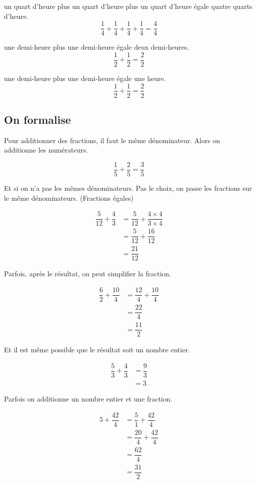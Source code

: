 \documentclass[12pt]{article}
\begin{document}
un quart d'heure plus un quart d'heure plus un quart d'heure égale quatre quarts d'heure.
$$\dfrac{1}{4} + \dfrac{1}{4} + \dfrac{1}{4} + \dfrac{1}{4}= \dfrac{4}{4}$$

une demi-heure plus une demi-heure égale deux demi-heures.
$$\dfrac{1}{2} + \dfrac{1}{2} = \dfrac{2}{2}$$

une demi-heure plus une demi-heure égale une heure.
$$\dfrac{1}{2} + \dfrac{1}{2} = \dfrac{2}{2}$$

\newpage
\subsection*{On formalise}

Pour additionner des fractions, il faut le même dénominateur. Alors on additionne les numérateurs. 

$$\dfrac{1}{5} + \dfrac{2}{5} = \dfrac{3}{5}$$

Et si on n'a pas les mêmes dénominateurs. Pas le choix, on passe les fractions sur le même dénominateurs. (Fractions égales)

\begin{align*}
\dfrac{5}{12} + \dfrac{4}{3} &= \dfrac{5}{12} + \dfrac{4 \times 4}{3 \times 4}\\
							 &= \dfrac{5}{12} + \dfrac{16}{12} \\
                             &= \dfrac{21}{12}								 
\end{align*}


Parfois, après le résultat, on peut simplifier la fraction.

\begin{align*}
\dfrac{6}{2} + \dfrac{10}{4} &= \dfrac{12}{4} + \dfrac{10}{4}\\
							 &= \dfrac{22}{4} \\
							 &= \dfrac{11}{2}					 
\end{align*}


Et il est même possible que le résultat soit un nombre entier.

\begin{align*}
\dfrac{5}{3} + \dfrac{4}{3} &= \dfrac{9}{3}\\
							&= 3			 
\end{align*}

Parfois on additionne un nombre entier et une fraction.

\begin{align*}
5 + \dfrac{42}{4} &=  \dfrac{5}{1} + \dfrac{42}{4}\\
				  &= \dfrac{20}{4} + \dfrac{42}{4}\\
				  &= \dfrac{62}{4} \\
				  &= \dfrac{31}{2}					 
\end{align*}
\end{document}

